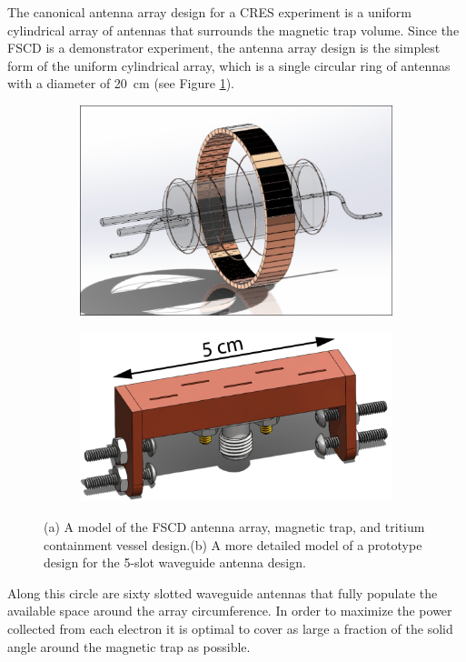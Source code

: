 The canonical antenna array design for a CRES experiment is a uniform cylindrical array of antennas that surrounds the magnetic trap volume. Since the FSCD is a demonstrator experiment, the antenna array design is the simplest form of the uniform cylindrical array, which is a single circular ring of antennas with a diameter of 20~cm (see Figure \ref{fig:chap3-fscd-render}).
\begin{figure}[htbp]
    \centering
    \begin{subfigure}{0.5\textwidth}
        \includegraphics*[width=\textwidth]{figs/Chapter-3/230614_fscd_render.png}
        \caption{}
    \end{subfigure}
    \hfill
    \begin{subfigure}{0.4\textwidth}
        \includegraphics*[width=\textwidth]{figs/Chapter-3/230614_5slot_model.png}
        \caption{}
    \end{subfigure}
    \caption{\label{fig:chap3-fscd-render} (a) A model of the FSCD antenna array, magnetic trap, and tritium containment vessel design.(b) A more detailed model of a prototype design for the 5-slot waveguide antenna design.}
\end{figure}
Along this circle are sixty slotted waveguide antennas that fully populate the available space around the array circumference. In order to maximize the power collected from each electron it is optimal to cover as large a fraction of the solid angle around the magnetic trap as possible. 

